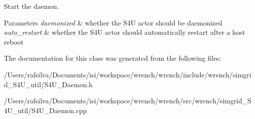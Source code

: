 Start the daemon. 


\begin{DoxyParams}{Parameters}
{\em daemonized} & whether the S4U actor should be daemonized \\
\hline
{\em auto\+\_\+restart} & whether the S4U actor should automatically restart after a host reboot \\
\hline
\end{DoxyParams}


The documentation for this class was generated from the following files\+:\begin{DoxyCompactItemize}
\item 
/\+Users/rafsilva/\+Documents/isi/workspace/wrench/wrench/include/wrench/simgrid\+\_\+\+S4\+U\+\_\+util/S4\+U\+\_\+\+Daemon.\+h\item 
/\+Users/rafsilva/\+Documents/isi/workspace/wrench/wrench/src/wrench/simgrid\+\_\+\+S4\+U\+\_\+util/S4\+U\+\_\+\+Daemon.\+cpp\end{DoxyCompactItemize}
